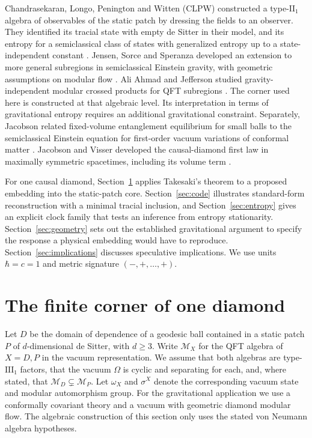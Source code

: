 \documentclass[11pt,a4paper]{article}
\numberwithin{equation}{section}
\theoremstyle{remark}
\newcommand{\M}{\mathcal M}
\begin{document}
Chandrasekaran, Longo, Penington and Witten (CLPW) constructed a type-$\mathrm{II}_1$ algebra of observables of the static patch by dressing the fields to an observer. They identified its tracial state with empty de Sitter in their model, and its entropy for a semiclassical class of states with generalized entropy up to a state-independent constant \cite{CLPW2022}. Jensen, Sorce and Speranza developed an extension to more general subregions in semiclassical Einstein gravity, with geometric assumptions on modular flow \cite{Jensen2023}. Ali Ahmad and Jefferson studied gravity-independent modular crossed products for QFT subregions \cite{AliAhmadJefferson2024}. The corner used here is constructed at that algebraic level. Its interpretation in terms of gravitational entropy requires an additional gravitational constraint. Separately, Jacobson related fixed-volume entanglement equilibrium for small balls to the semiclassical Einstein equation for first-order vacuum variations of conformal matter \cite{Jacobson2016}. Jacobson and Visser developed the causal-diamond first law in maximally symmetric spacetimes, including its volume term \cite{JacobsonVisser2019}.

For one causal diamond, Section~\ref{sec:corner} applies Takesaki's theorem to a proposed embedding into the static-patch core. Section~\ref{sec:code} illustrates standard-form reconstruction with a minimal tracial inclusion, and Section~\ref{sec:entropy} gives an explicit clock family that tests an inference from entropy stationarity. Section~\ref{sec:geometry} sets out the established gravitational argument to specify the response a physical embedding would have to reproduce. Section~\ref{sec:implications} discusses speculative implications. We use units $\hbar=c=1$ and metric signature $(-,+,\ldots,+)$.

\section{The finite corner of one diamond}
\label{sec:corner}

Let $D$ be the domain of dependence of a geodesic ball contained in a static patch $P$ of $d$-dimensional de Sitter, with $d\geq3$. Write $\M_X$ for the QFT algebra of $X=D,P$ in the vacuum representation. We assume that both algebras are type-$\mathrm{III}_1$ factors, that the vacuum $\Omega$ is cyclic and separating for each, and, where stated, that $\M_D\subsetneq\M_P$. Let $\omega_X$ and $\sigma^{X}$ denote the corresponding vacuum state and modular automorphism group. For the gravitational application we use a conformally covariant theory and a vacuum with geometric diamond modular flow. The algebraic construction of this section only uses the stated von Neumann algebra hypotheses.
\end{document}
